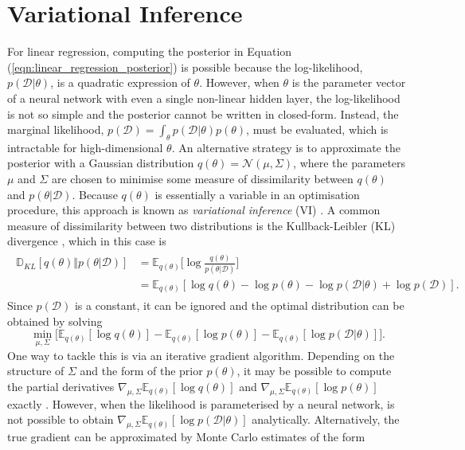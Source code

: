 \documentclass[msc,deptreport.inf]{infthesis} %
\newcommand{\E}{\mathbb E}
\newcommand{\D}{\mathbb D}
\begin{document}
\section{Variational Inference}\label{sec:vi}

For linear regression, computing the posterior in Equation (\ref{eqn:linear_regression_posterior}) is possible because the log-likelihood, $p(\mathcal{D} | \theta)$, is a quadratic expression of $\theta$. However, when $\theta$ is the parameter vector of a neural network with even a single non-linear hidden layer, the log-likelihood is not so simple and the posterior cannot be written in closed-form. Instead, the marginal likelihood, $p(\mathcal{D}) = \int_\theta p(\mathcal{D} | \theta) p(\theta)$, must be evaluated, which is intractable for high-dimensional $\theta$. An alternative strategy is to approximate the posterior with a Gaussian distribution $q(\theta) = \mathcal{N}(\mu, \Sigma)$, where the parameters $\mu$ and $\Sigma$ are chosen to minimise some measure of dissimilarity between $q(\theta)$ and $p(\theta | \mathcal{D})$. Because $q(\theta)$ is essentially a variable in an optimisation procedure, this approach is known as \emph{variational inference} (VI) \cite{barber2007}. A common measure of dissimilarity between two distributions is the Kullback-Leibler (KL) divergence \cite{barber2007}, which in this case is
\begin{align}
\begin{split}
	\D_{KL}[q(\theta) \Vert p(\theta | \mathcal{D})] 
	& = \E_{q(\theta)} \Big[\log \frac{q(\theta)}{p(\theta | \mathcal{D})}\Big] \\
	& = \E_{q(\theta)} [\log q(\theta) - \log p(\theta) - \log p(\mathcal{D} | \theta) + \log p(\mathcal{D})].
\end{split}
\end{align}
Since $p(\mathcal{D})$ is a constant, it can be ignored and the optimal distribution can be obtained by solving 
\begin{equation}\label{eqn:vi_objective}
	\min_{\mu, \Sigma} \big[ \E_{q(\theta)} [\log q(\theta)] - \E_{q(\theta)} [\log p(\theta) ] - \E_{q(\theta)} [\log p(\mathcal{D} | \theta)] \big].
\end{equation}
One way to tackle this is via an iterative gradient algorithm. Depending on the structure of $\Sigma$ and the form of the prior $p(\theta)$, it may be possible to compute the partial derivatives $\nabla_{\mu, \Sigma} \E_{q(\theta)} [\log q(\theta)]$ and $\nabla_{\mu, \Sigma} \E_{q(\theta)} [\log p(\theta) ]$ exactly \cite{kingma2013}. However, when the likelihood is parameterised by a neural network, is not possible to obtain $ \nabla_{\mu, \Sigma}\E_{q(\theta)} [\log p(\mathcal{D} | \theta)]$ analytically. Alternatively, the true gradient can be approximated by Monte Carlo estimates of the form 
\end{document}
